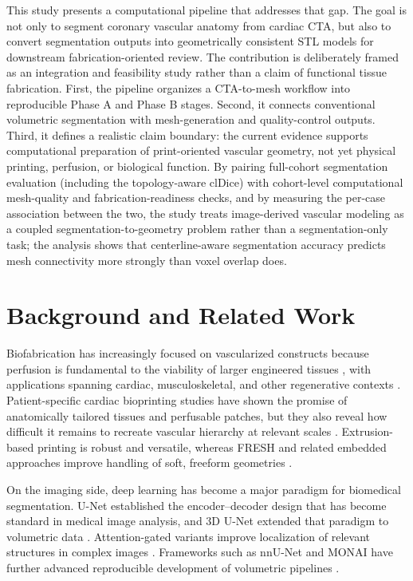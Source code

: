 \documentclass[anonymous]{iopjournal}
\begin{document}
This study presents a computational pipeline that addresses that gap. The goal is not only to segment coronary vascular anatomy from cardiac CTA, but also to convert segmentation outputs into geometrically consistent STL models for downstream fabrication-oriented review. The contribution is deliberately framed as an integration and feasibility study rather than a claim of functional tissue fabrication. First, the pipeline organizes a CTA-to-mesh workflow into reproducible Phase A and Phase B stages. Second, it connects conventional volumetric segmentation with mesh-generation and quality-control outputs. Third, it defines a realistic claim boundary: the current evidence supports computational preparation of print-oriented vascular geometry, not yet physical printing, perfusion, or biological function. By pairing full-cohort segmentation evaluation (including the topology-aware clDice) with cohort-level computational mesh-quality and fabrication-readiness checks, and by measuring the per-case association between the two, the study treats image-derived vascular modeling as a coupled segmentation-to-geometry problem rather than a segmentation-only task; the analysis shows that centerline-aware segmentation accuracy predicts mesh connectivity more strongly than voxel overlap does.

\section{Background and Related Work}

Biofabrication has increasingly focused on vascularized constructs because perfusion is fundamental to the viability of larger engineered tissues \cite{groll2016,lovett2009,rouwkema2016,oconnor2022}, with applications spanning cardiac, musculoskeletal, and other regenerative contexts \cite{yang2023}. Patient-specific cardiac bioprinting studies have shown the promise of anatomically tailored tissues and perfusable patches, but they also reveal how difficult it remains to recreate vascular hierarchy at relevant scales \cite{noor2019,wu2023,alonzo2019}. Extrusion-based printing is robust and versatile, whereas FRESH and related embedded approaches improve handling of soft, freeform geometries \cite{ozbolat2016,hinton2015}.

On the imaging side, deep learning has become a major paradigm for biomedical segmentation. U-Net established the encoder--decoder design that has become standard in medical image analysis, and 3D U-Net extended that paradigm to volumetric data \cite{ronneberger2015,cicek2016}. Attention-gated variants improve localization of relevant structures in complex images \cite{oktay2018}. Frameworks such as nnU-Net and MONAI have further advanced reproducible development of volumetric pipelines \cite{isensee2021,cardoso2022}.
\end{document}
